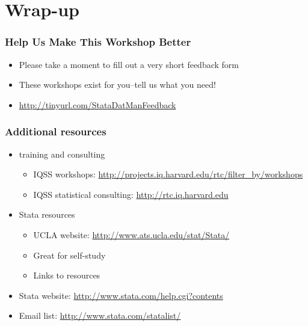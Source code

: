 \documentclass[table]{beamer}
\begin{document}
\section{Wrap-up}
\label{sec-8}
\begin{frame}
\frametitle{Help Us Make This Workshop Better}
\label{sec-8-1}

\begin{itemize}
\item Please take a moment to fill out a very short feedback form
\item These workshops exist for you--tell us what you need!
\item \href{http://tinyurl.com/StataDatManFeedback}{http://tinyurl.com/StataDatManFeedback}
\end{itemize}
\end{frame}
\begin{frame}
\frametitle{Additional resources}
\label{sec-8-2}

\begin{itemize}
\item training and consulting
\begin{itemize}
\item IQSS workshops: \href{http://projects.iq.harvard.edu/rtc/filter_by/workshops}{http://projects.iq.harvard.edu/rtc/filter\_by/workshops}
\item IQSS statistical consulting: \href{http://rtc.iq.harvard.edu}{http://rtc.iq.harvard.edu}
\end{itemize}
\item Stata resources
\begin{itemize}
\item UCLA website: \href{http://www.ats.ucla.edu/stat/Stata/}{http://www.ats.ucla.edu/stat/Stata/}
\item Great for self-study
\item Links to resources
\end{itemize}
\item Stata website: \href{http://www.stata.com/help.cgi?contents}{http://www.stata.com/help.cgi?contents}
\item Email list: \href{http://www.stata.com/statalist/}{http://www.stata.com/statalist/}
\end{itemize}
\end{frame}
\end{document}
